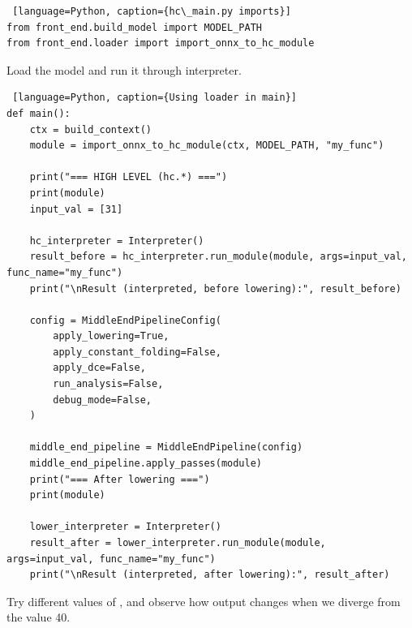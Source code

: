 \documentclass[../main.tex]{subfiles}
\begin{document}
\begin{lstlisting} [language=Python, caption={hc\_main.py imports}]
from front_end.build_model import MODEL_PATH
from front_end.loader import import_onnx_to_hc_module
\end{lstlisting}
Load the model and run it through interpreter.
\begin{lstlisting} [language=Python, caption={Using loader in main}]
def main():
    ctx = build_context()
    module = import_onnx_to_hc_module(ctx, MODEL_PATH, "my_func")

    print("=== HIGH LEVEL (hc.*) ===")
    print(module)
    input_val = [31]

    hc_interpreter = Interpreter()
    result_before = hc_interpreter.run_module(module, args=input_val, func_name="my_func")
    print("\nResult (interpreted, before lowering):", result_before)

    config = MiddleEndPipelineConfig(
        apply_lowering=True,
        apply_constant_folding=False,
        apply_dce=False,
        run_analysis=False,
        debug_mode=False,
    )

    middle_end_pipeline = MiddleEndPipeline(config)
    middle_end_pipeline.apply_passes(module)
    print("=== After lowering ===")
    print(module)

    lower_interpreter = Interpreter()
    result_after = lower_interpreter.run_module(module, args=input_val, func_name="my_func")
    print("\nResult (interpreted, after lowering):", result_after)
\end{lstlisting}
Try different values of , and observe how output changes when we diverge from
the value 40.
\end{document}
